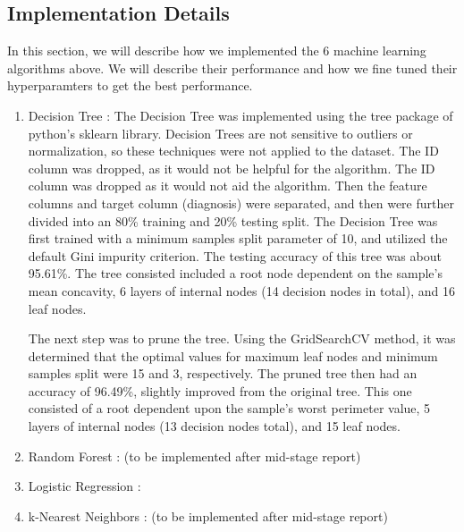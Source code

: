\documentclass[conference]{IEEEtran}
\begin{document}
\subsection{Implementation Details}
In this section, we will describe how we implemented the 6 machine learning algorithms above. We will describe their performance and how we fine tuned their hyperparamters to get the best performance. 

\begin{enumerate}
     \item Decision Tree : The Decision Tree was implemented using the tree package of python's sklearn library. Decision Trees are not sensitive to outliers or normalization, so these techniques were not applied to the dataset. The ID column was dropped, as it would not be helpful for the algorithm. The ID column was dropped as it would not aid the algorithm. Then the feature columns and target column (diagnosis) were separated, and then were further divided into an 80\% training and 20\% testing split.
    The Decision Tree was first trained with a minimum samples split parameter of 10, and utilized the default Gini impurity criterion. The testing accuracy of this tree was about 95.61\%. The tree consisted included a root node dependent on the sample's mean concavity, 6 layers of internal nodes (14 decision nodes in total), and 16 leaf nodes.
    
    The next step was to prune the tree. Using the GridSearchCV method, it was determined that the optimal values for maximum leaf nodes and minimum samples split were 15 and 3, respectively. The pruned tree then had an accuracy of 96.49\%, slightly improved from the original tree. This one consisted of a root dependent upon the sample's worst perimeter value, 5 layers of internal nodes (13 decision nodes total), and 15 leaf nodes.

    \item Random Forest : (to be implemented after mid-stage report)

    \item Logistic Regression : 

    \item k-Nearest Neighbors : (to be implemented after mid-stage report)


\end{enumerate}
\end{document}
